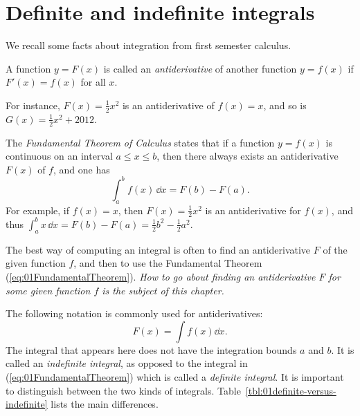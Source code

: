 \section{Definite and indefinite integrals} %
\label{sec:the-indefinite-integral}
We recall some facts about integration from first semester calculus.
\begin{definition}
  A function $y=F(x)$ is called an \emph{antiderivative} of another function
  $y=f (x)$ if $F'(x)=f(x)$ for all $x$.
\end{definition}
\medskip

For instance, $F(x) = \frac12 x^2$ is an antiderivative of $f(x) = x$, and so is
$G(x) = \frac12x^2+2012$.

The \emph{Fundamental Theorem of Calculus} states that if a function $y=f(x)$ is
continuous on an interval $a\leq x\leq b$, then there always exists an
antiderivative $F(x)$ of $f$, and one has
\begin{equation}
  \label{eq:01FundamentalTheorem}
  \int_a^b f(x)\,\dd x =F(b)-F(a).
\end{equation}
For example, if $f(x) = x$, then $F(x) = \frac12x^2$ is an antiderivative for
$f(x)$, and thus $\int_a^b x\,\dd x = F(b)-F(a) = \frac12b^2 -\frac12a^2$.

The best way of computing an integral is often to find an antiderivative $F$ of
the given function $f$, and then to use the Fundamental Theorem
(\ref{eq:01FundamentalTheorem}).  \textit{How to go about finding an
  antiderivative $F$ for some given function $f$ is the subject of this
  chapter.}

The following notation is commonly used for antiderivatives:
\begin{equation}
  \label{eq:2}
  F(x) = \int f(x) \dd x .
\end{equation}
The integral that appears here does not have the integration bounds $a$ and
$b$. It is called an \emph{indefinite integral}, as opposed to the integral in
(\ref{eq:01FundamentalTheorem}) which is called a \emph{definite integral}. It
is important to distinguish between the two kinds of integrals.
Table~\ref{tbl:01definite-versus-indefinite} lists the main differences.
\smallskip

